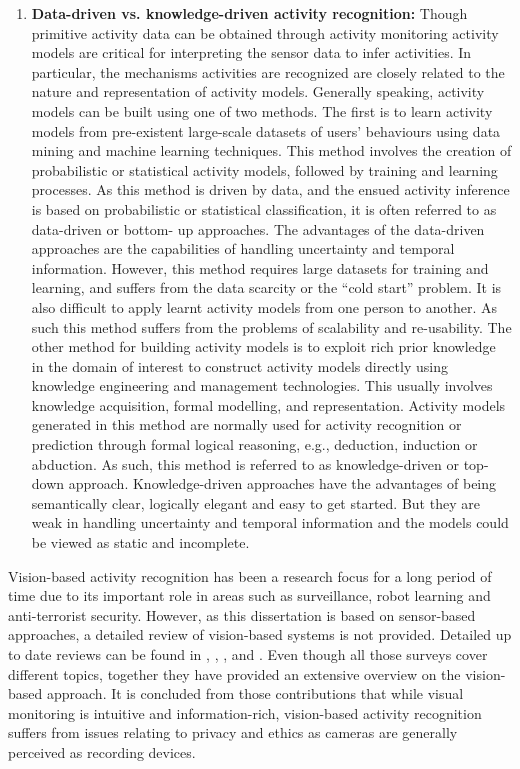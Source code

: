 \begin{enumerate}
 \item \textbf{Data-driven vs. knowledge-driven activity recognition:} Though primitive activity data can be obtained through activity monitoring activity models are critical for interpreting the sensor data to infer activities. In particular, the mechanisms activities are recognized are closely related to the nature and representation of activity models. Generally speaking, activity models can be built using one of two methods. The first is to learn activity models from pre-existent large-scale datasets of users’ behaviours using data mining and machine learning techniques. This method involves the creation of probabilistic or statistical activity models, followed by training and learning processes. As this method is driven by data, and the ensued activity inference is based on probabilistic or statistical classification, it is often referred to as data-driven or bottom- up approaches. The advantages of the data-driven approaches are the capabilities of handling uncertainty and temporal information. However, this method requires large datasets for training and learning, and suffers from the data scarcity or the “cold start” problem. It is also difficult to apply learnt activity models from one person to another. As such this method suffers from the problems of scalability and re-usability. The other method for building activity models is to exploit rich prior knowledge in the domain of interest to construct activity models directly using knowledge engineering and management technologies. This usually involves knowledge acquisition, formal modelling, and representation. Activity models generated in this method are normally used for activity recognition or prediction through formal logical reasoning, e.g., deduction, induction or abduction. As such, this method is referred to as knowledge-driven or top-down approach. Knowledge-driven approaches have the advantages of being semantically clear, logically elegant and easy to get started. But they are weak in handling uncertainty and temporal information and the models could be viewed as static and incomplete.
\end{enumerate}
 
Vision-based activity recognition has been a research focus for a long period of time due to its important role in areas such as surveillance, robot learning and anti-terrorist security. However, as this dissertation is based on sensor-based approaches, a detailed review of vision-based systems is not provided. Detailed up to date reviews can be found in \cite{Poppe2010}, \cite{Moeslund2006}, \cite{Yilmaz2006}, \cite{Weinland2011} and \cite{Turaga2008}. Even though all those surveys cover different topics, together they have provided an extensive overview on the vision-based approach. It is concluded from those contributions that while visual monitoring is intuitive and information-rich, vision-based activity recognition suffers from issues relating to privacy and ethics \cite{Yilmaz2006} as cameras are generally perceived as recording devices.


